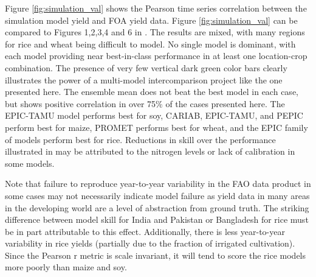 \documentclass[preprint, 5p, times, twocolumn]{elsarticle}
\begin{document}
Figure \ref{fig:simulation_val} shows the Pearson time series correlation between the simulation model yield and FOA yield data. Figure \ref{fig:simulation_val} can be compared to Figures 1,2,3,4 and 6 in \citet{muller_global_2017}. The results are mixed, with many regions for rice and wheat being difficult to model. No single model is dominant, with each model providing near best-in-class performance in at least one location-crop combination. The presence of very few vertical dark green color bars clearly illustrates the power of a multi-model intercomparison project like the one presented here. The ensemble mean does not beat the best model in each case, but shows positive correlation in over 75\% of the cases presented here. The EPIC-TAMU model performs best for soy, CARIAB, EPIC-TAMU, and PEPIC perform best for maize, PROMET performs best for wheat, and the EPIC family of models perform best for rice. {\color{blue} Reductions in skill over the performance illustrated in \citet{muller_global_2017} may be attributed to the nitrogen levels or lack of calibration in some models.}

Note that failure to reproduce year-to-year variability in the FAO data product in some cases may not necessarily indicate model failure as yield data in many areas in the developing world are a level of abstraction from ground truth. The striking difference between model skill for India and Pakistan or Bangladesh for rice must be in part attributable to this effect. Additionally, there is less year-to-year variability in rice yields (partially due to the fraction of irrigated cultivation). Since the Pearson r metric is scale invariant, it will tend to score the rice models more poorly than maize and soy. 

\end{document}
